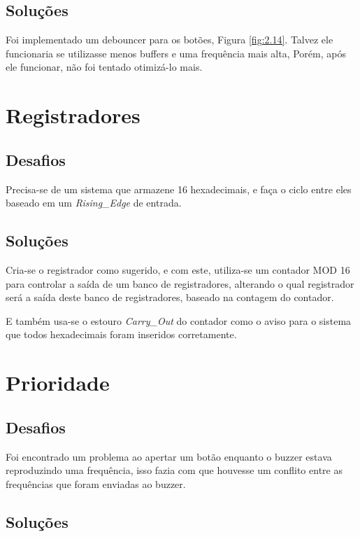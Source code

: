 \subsection{Soluções}

Foi implementado um debouncer para os botões, Figura \ref{fig:2.14}. Talvez ele funcionaria se utilizasse menos buffers e uma frequência mais alta, Porém, após ele funcionar, não foi tentado otimizá-lo mais.


\section{Registradores}

\subsection{Desafios}

Precisa-se de um sistema que armazene 16 hexadecimais, e faça o ciclo entre eles baseado em um \emph{Rising\_Edge} de entrada.

\subsection{Soluções}

Cria-se o registrador como sugerido, e com este, utiliza-se um contador MOD 16 para controlar a saída de um banco de registradores, alterando o qual registrador será a saída deste banco de registradores, baseado na contagem do contador.

E também usa-se o estouro \emph{Carry\_Out} do contador como o aviso para o sistema que todos hexadecimais foram inseridos corretamente.


\section{Prioridade}

\subsection{Desafios}

Foi encontrado um problema ao apertar um botão enquanto o buzzer estava reproduzindo uma frequência, isso fazia com que houvesse um conflito entre as frequências que foram enviadas ao buzzer. 

\subsection{Soluções}

